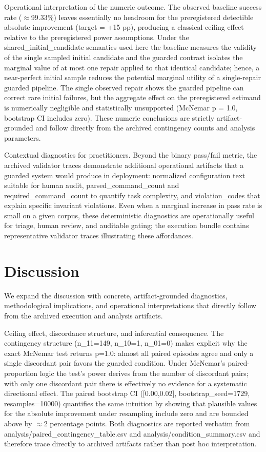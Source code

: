 \documentclass[conference]{IEEEtran}
\begin{document}
Operational interpretation of the numeric outcome. The observed baseline success rate (\ensuremath{\approx}99.33\%) leaves essentially no headroom for the preregistered detectible absolute improvement (target = +15 pp), producing a classical ceiling effect relative to the preregistered power assumptions. Under the shared\_initial\_candidate semantics used here the baseline measures the validity of the single sampled initial candidate and the guarded contrast isolates the marginal value of at most one repair applied to that identical candidate; hence, a near-perfect initial sample reduces the potential marginal utility of a single-repair guarded pipeline. The single observed repair shows the guarded pipeline can correct rare initial failures, but the aggregate effect on the preregistered estimand is numerically negligible and statistically unsupported (McNemar p = 1.0, bootstrap CI includes zero). These numeric conclusions are strictly artifact-grounded and follow directly from the archived contingency counts and analysis parameters.

Contextual diagnostics for practitioners. Beyond the binary pass/fail metric, the archived validator traces demonstrate additional operational artifacts that a guarded system would produce in deployment: normalized configuration text suitable for human audit, parsed\_command\_count and required\_command\_count to quantify task complexity, and violation\_codes that explain specific invariant violations. Even when a marginal increase in pass rate is small on a given corpus, these deterministic diagnostics are operationally useful for triage, human review, and auditable gating; the execution bundle contains representative validator traces illustrating these affordances.

\section{Discussion}
We expand the discussion with concrete, artifact-grounded diagnostics, methodological implications, and operational interpretations that directly follow from the archived execution and analysis artifacts.

Ceiling effect, discordance structure, and inferential consequence. The contingency structure (n\_11=149, n\_10=1, n\_01=0) makes explicit why the exact McNemar test returns p=1.0: almost all paired episodes agree and only a single discordant pair favors the guarded condition. Under McNemar's paired-proportion logic the test's power derives from the number of discordant pairs; with only one discordant pair there is effectively no evidence for a systematic directional effect. The paired bootstrap CI ([0.00,0.02], bootstrap\_seed=1729, resamples=10000) quantifies the same intuition by showing that plausible values for the absolute improvement under resampling include zero and are bounded above by \ensuremath{\approx}2 percentage points. Both diagnostics are reported verbatim from analysis/paired\_contingency\_table.csv and analysis/condition\_summary.csv and therefore trace directly to archived artifacts rather than post hoc interpretation.
\end{document}
